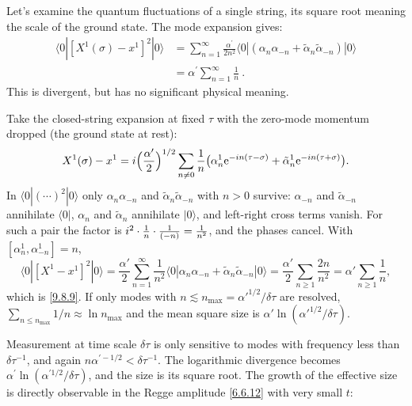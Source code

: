 Let's examine the quantum fluctuations of a single string, its square root meaning the scale of the ground state. The mode expansion gives:
\begin{align}
	\langle 0 |[X^{1}(\sigma)-x^{1}]^{2}|
	0\rangle &= \sum_{n=1}^{\infty} \frac{\alpha^{\prime}}{2 n^{2}}
	\langle 0|(\alpha_{n} \alpha_{-n} + \tilde{\alpha}_{n} \tilde{\alpha}_{-n})| 0\rangle  \nonumber \\
	&= \alpha^{\prime} \sum_{n=1}^{\infty} \frac{1}{n} \:. \label{9.8.9}
\end{align}
This is divergent, but has no significant physical meaning.
\begin{tcolorbox}[breakable]
	\begin{remark}
		Take the closed-string expansion at fixed $\tau$ with the zero-mode momentum dropped (the ground state at rest):
		\begin{equation*}
			X^1(\sigma)-x^1=i\Bigl(\frac{\alpha'}{2}\Bigr)^{1/2}\sum_{n\ne0}\frac1n\bigl(\alpha^1_n\mathrm{e}^{-i n(\tau-\sigma)}+\tilde\alpha^1_n\mathrm{e}^{-i n(\tau+\sigma)}\bigr) .
		\end{equation*}
		In $\langle0|(\cdots)^2|0\rangle$ only $\alpha_n\alpha_{-n}$ and $\tilde\alpha_n\tilde\alpha_{-n}$ with $n>0$ survive: $\alpha_{-n}$ and $\tilde\alpha_{-n}$ annihilate $\langle0|$, $\alpha_n$ and $\tilde\alpha_n$ annihilate $|0\rangle$, and left-right cross terms vanish. For such a pair the factor is $i^2\cdot\frac{1}{n}\cdot\frac{1}{(-n)}=\frac{1}{n^2}$, and the phases cancel. With $[\alpha^1_n,\alpha^1_{-n}]=n$,
		\begin{equation*}
			\langle0|[X^1-x^1]^2|0\rangle=\frac{\alpha'}{2}\sum_{n=1}^\infty\frac{1}{n^2}\langle0|\alpha_n\alpha_{-n}+\tilde\alpha_n\tilde\alpha_{-n}|0\rangle=\frac{\alpha'}{2}\sum_{n\ge1}\frac{2n}{n^2}=\alpha'\sum_{n\ge1}\frac1n ,
		\end{equation*}
		which is \eqref{9.8.9}. If only modes with $n\lesssim n_{\max}=\alpha'^{1/2}/\delta\tau$ are resolved, $\sum_{n\le n_{\max}}1/n\approx\ln n_{\max}$ and the mean square size is $\alpha'\ln(\alpha'^{1/2}/\delta\tau)$.
	\end{remark}
\end{tcolorbox}
Measurement at time scale $\delta \tau$ is only sensitive to modes with frequency less than $\delta \tau^{-1}$, 
and again $n \alpha^{\prime-1 / 2}<\delta \tau^{-1}$. The logarithmic divergence becomes $\alpha^{\prime} \ln(\alpha^{\prime 1/2} / \delta\tau)$, and the size is its square root.
The growth of the effective size is directly observable in the Regge amplitude \eqref{6.6.12} with very small $t$:
